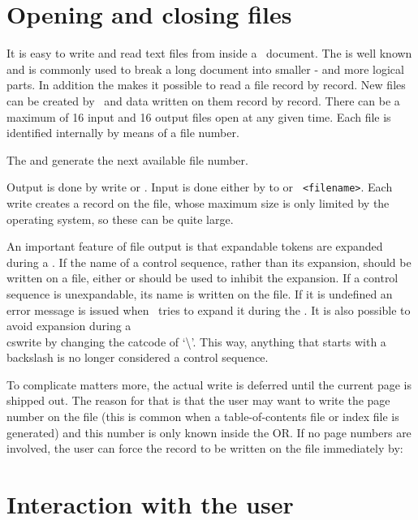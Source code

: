 \section{Opening and closing files}

It is easy to write and read text files from inside a \tex\  document. The  is well known and is commonly used
to break a long document into smaller - and more logical parts. In addition the  makes it  possible to
read a file record by record. New files can be created by \tex\ and data written on them record by record. There can be
a maximum of 16 input and 16 output files open at any given time. Each file is identified  internally by means of a file number. 


The \cmd{\newread} and \cmd{\newwrite} generate the next available file number. 



Output is done by write or \cmd{\immediate}\cmd{\write}. Input is done either by  to or 
\verb+ <filename>+. Each write creates a record on the file, whose maximum size is only limited by the operating system, so these can be quite large.

An important feature of file output is that expandable tokens are expanded during a . If the
name of a control sequence, rather than its expansion, should be written on a file, either
\cmd{\noexpand} or \cmd{\string} should be used to inhibit the expansion. If a control sequence is unexpandable,
its name is written on the file. If it is undefined an error message is issued when \tex\ tries to expand it during
the \cmd{\write}. It is also possible to avoid expansion during a \\cs{write} by changing the catcode of `\textbackslash'.
This way, anything that starts with a backslash is no longer considered a control sequence.

To complicate matters more, the actual write is deferred until the current page is shipped out. The reason for that is that the user may want to write the page number on the file (this is common when a table-of-contents file or index file is generated) and this number is only known inside the OR. If no page numbers are involved, the user can force the record to be written on the file immediately by:

\begin{teXXX}
  \immediate\write
\end{teXXX}

\section{Interaction with the user}

